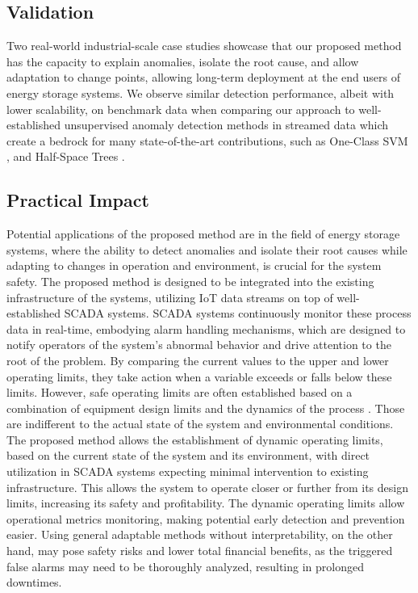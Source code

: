 \subsection{Validation}\label{par:validation}
Two real-world industrial-scale case studies showcase that our proposed method has the capacity to explain anomalies, isolate the root cause, and allow adaptation to change points, allowing long-term deployment at the end users of energy storage systems. We observe similar detection performance, albeit with lower scalability, on benchmark data when comparing our approach to well-established unsupervised anomaly detection methods in streamed data which create a bedrock for many state-of-the-art contributions, such as One-Class SVM \citep{Amer2013, Liu2014, Krawczyk2015, Miao2019, Gozuacik2021}, and Half-Space Trees \citep{Wetzig2019, Lyu2020}.

\subsection{Practical Impact}\label{par:practical_impact}
Potential applications of the proposed method are in the field of energy storage systems, where the ability to detect anomalies and isolate their root causes while adapting to changes in operation and environment, is crucial for the system safety. The proposed method is designed to be integrated into the existing infrastructure of the systems, utilizing IoT data streams on top of well-established SCADA systems. SCADA systems continuously monitor these process data in real-time, embodying alarm handling mechanisms, which are designed to notify operators of the system's abnormal behavior and drive attention to the root of the problem. By comparing the current values to the upper and lower operating limits, they take action when a variable exceeds or falls below these limits. However, safe operating limits are often established based on a combination of equipment design limits and the dynamics of the process \citep{Stauffer2021}. Those are indifferent to the actual state of the system and environmental conditions. The proposed method allows the establishment of dynamic operating limits, based on the current state of the system and its environment, with direct utilization in SCADA systems expecting minimal intervention to existing infrastructure. This allows the system to operate closer or further from its design limits, increasing its safety and profitability. The dynamic operating limits allow operational metrics monitoring, making potential early detection and prevention easier. Using general adaptable methods without interpretability, on the other hand, may pose safety risks and lower total financial benefits, as the triggered false alarms may need to be thoroughly analyzed, resulting in prolonged downtimes.

